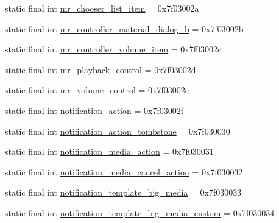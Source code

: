 \begin{CompactItemize}
\item 
static final int \hyperlink{classandroid_1_1support_1_1graphics_1_1drawable_1_1animated_1_1_r_1_1layout_dbeee2973cb8a860c6a9d1aea31f19a3}{mr\_\-chooser\_\-list\_\-item} = 0x7f03002a
\item 
static final int \hyperlink{classandroid_1_1support_1_1graphics_1_1drawable_1_1animated_1_1_r_1_1layout_49be9e3229615db09d05dbb814a24cec}{mr\_\-controller\_\-material\_\-dialog\_\-b} = 0x7f03002b
\item 
static final int \hyperlink{classandroid_1_1support_1_1graphics_1_1drawable_1_1animated_1_1_r_1_1layout_1f59f0b6d4cefa714aeabdaaa863ae8e}{mr\_\-controller\_\-volume\_\-item} = 0x7f03002c
\item 
static final int \hyperlink{classandroid_1_1support_1_1graphics_1_1drawable_1_1animated_1_1_r_1_1layout_305fcc5ba5a3e4d9c850ef29c29046e5}{mr\_\-playback\_\-control} = 0x7f03002d
\item 
static final int \hyperlink{classandroid_1_1support_1_1graphics_1_1drawable_1_1animated_1_1_r_1_1layout_d0e5ba6cbeac574e118a7d4d9a338d62}{mr\_\-volume\_\-control} = 0x7f03002e
\item 
static final int \hyperlink{classandroid_1_1support_1_1graphics_1_1drawable_1_1animated_1_1_r_1_1layout_d8fa3aa927ce0832769f14c9a70be804}{notification\_\-action} = 0x7f03002f
\item 
static final int \hyperlink{classandroid_1_1support_1_1graphics_1_1drawable_1_1animated_1_1_r_1_1layout_8e93fbeb3108c37f7f947617475bc638}{notification\_\-action\_\-tombstone} = 0x7f030030
\item 
static final int \hyperlink{classandroid_1_1support_1_1graphics_1_1drawable_1_1animated_1_1_r_1_1layout_9b782faccd0bba3f8d9c417609c09a15}{notification\_\-media\_\-action} = 0x7f030031
\item 
static final int \hyperlink{classandroid_1_1support_1_1graphics_1_1drawable_1_1animated_1_1_r_1_1layout_af3235bcb952af4d0cdc14c03d0a1594}{notification\_\-media\_\-cancel\_\-action} = 0x7f030032
\item 
static final int \hyperlink{classandroid_1_1support_1_1graphics_1_1drawable_1_1animated_1_1_r_1_1layout_52956c669a8d44f0d165c0633aad557d}{notification\_\-template\_\-big\_\-media} = 0x7f030033
\item 
static final int \hyperlink{classandroid_1_1support_1_1graphics_1_1drawable_1_1animated_1_1_r_1_1layout_21b34164d8ed3f5730d7f230272910dd}{notification\_\-template\_\-big\_\-media\_\-custom} = 0x7f030034
\item 

\end{CompactItemize}
